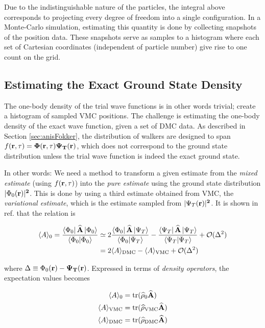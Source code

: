 Due to the indistinguishable nature of the particles, the integral above corresponds to projecting every degree of freedom into a single configuration. In a Monte-Carlo simulation, estimating this quantity is done by collecting snapshots of the position data. These snapshots serve as samples to a histogram where each set of Cartesian coordinates (independent of particle number) give rise to one count on the grid.

\subsection{Estimating the Exact Ground State Density}

The one-body density of the trial wave functions is in other words trivial; create a histogram of sampled VMC positions. The challenge is estimating the one-body density of the exact wave function, given a set of DMC data. As described in Section \ref{sec:anisFokker}, the distribution of walkers are designed to span $f(\bf r, \tau) = \Phi(\bf r, \tau)\Psi_T(\bf r)$, which does not correspond to the ground state distribution unless the trial wave function is indeed the exact ground state. 

In other words: We need a method to transform a given estimate from the \textit{mixed estimate} (using $f(\bf r, \tau)$) into the \textit{pure estimate} using the ground state distribution $|\Phi_0(\bf r)|^2$. This is done by using a third estimate obtained from VMC, the \textit{variational estimate}, which is the estimate sampled from $|\Psi_T(\bf r)|^2$. It is shown in ref. \cite{abInitioMC} that the relation is

\begin{align}
 \langle A \rangle_0 = \frac{\left< \Phi_0 \right|{\bf\widehat{A}}\left| \Phi_0 \right>}{\left\langle \Phi_0 | \Phi_0\right\rangle} &\simeq  2\frac{\left< \Phi_0 \right|{\bf\widehat{A}}\left| \Psi_T \right>}{\left\langle \Phi_0 | \Psi_T\right\rangle} -  \frac{\left< \Psi_T \right|{\bf\widehat{A}}\left| \Psi_T \right>}{\left\langle \Psi_T | \Psi_T\right\rangle} + \mathcal{O}(\Delta^2)\notag\\
  &= 2\langle A \rangle_\mathrm{DMC} - \langle A \rangle_\mathrm{VMC}  + \mathcal{O}(\Delta^2) \label{eq:PureEstimRelat}
\end{align}

where $\Delta \equiv \Phi_0(\bf r) - \Psi_T(\bf r)$. Expressed in terms of \textit{density operators}, the expectation values becomes

\newcommand{\tr}{\mathrm{tr}}

\begin{align*}
 \langle A \rangle_0 &= \tr(\OP{\rho}_0\OP{A}) \\
 \langle A \rangle_\mathrm{VMC} &= \tr(\OP{\rho}_\mathrm{VMC}\OP{A}) \\
 \langle A \rangle_\mathrm{DMC} &= \tr(\OP{\rho}_\mathrm{DMC}\OP{A}) 
 \end{align*}

